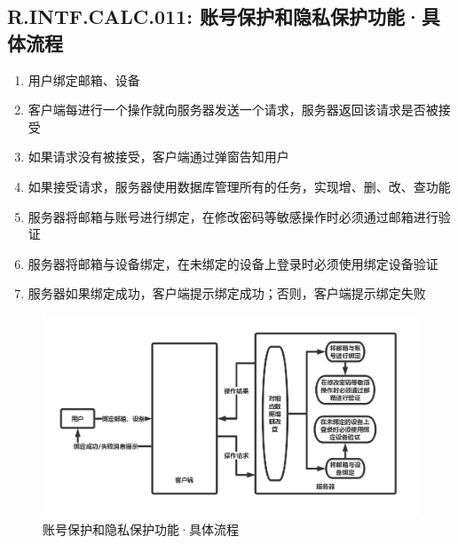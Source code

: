     \subsection{R.INTF.CALC.011: 账号保护和隐私保护功能·具体流程}
    \begin{enumerate}
        \item 用户绑定邮箱、设备
        \item 客户端每进行一个操作就向服务器发送一个请求，服务器返回该请求是否被接受
        \item 如果请求没有被接受，客户端通过弹窗告知用户
        \item 如果接受请求，服务器使用数据库管理所有的任务，实现增、删、改、查功能
        \item 服务器将邮箱与账号进行绑定，在修改密码等敏感操作时必须通过邮箱进行验证
        \item 服务器将邮箱与设备绑定，在未绑定的设备上登录时必须使用绑定设备验证
        \item 服务器如果绑定成功，客户端提示绑定成功；否则，客户端提示绑定失败
    \end{enumerate}
    \newpage
        \begin{figure}[h]
            \centering
            \includegraphics[scale=0.4]{OutlineDesign/figures/账号保护和隐私保护功能·具体流程.png}
            \caption{账号保护和隐私保护功能·具体流程}
            \label{fig:server_flow}
        \end{figure}

